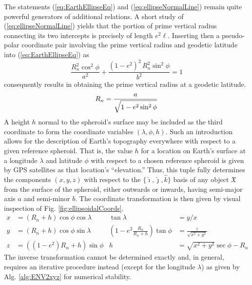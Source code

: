 \documentclass[11pt,dvipsnames]{thesis}
\begin{document}
The statements (\ref{eq:EarthEllipseEq}) and (\ref{eq:ellipseNormalLine}) remain quite powerful generators of additional relations. A short study of (\ref{eq:ellipseNormalLine}) yields that the portion of prime vertical radius connecting its two intercepts is precisely of length $e^2\ell$. Inserting then a pseudo-polar coordinate pair involving the prime vertical radius and geodetic latitude into (\ref{eq:EarthEllipseEq}) as
\begin{equation}
\frac{R_n^2 \cos^2\phi}{a^2} + \frac{(1 - e^2)^2\,R_n^2\sin^2\phi}{b^2} = 1
\end{equation}
consequently results in obtaining the prime vertical radius at a geodetic latitude.
\begin{equation}
R_n = \frac{a}{\sqrt{\vphantom{\cosphantom^2}1 - e^2 \,\smash{\sin}^2\,\phi}} \label{eq:primeVerticalRadius}
\end{equation}
A height $h$ normal to the spheroid's surface may be included as the third coordinate to form the coordinate variables $(\lambda, \phi, h)$. Such an introduction allows for the description of Earth's topography everywhere with respect to a given reference spheroid. That is, the value $h$ for a location on Earth's surface at a longitude $\lambda$ and latitude $\phi$ with respect to a chosen reference spheroid is given by GPS satellites as that location's ``elevation.'' Thus, this tuple fully determines the components $(x, y, z)$ with respect to the $\{\hat{\imath}, \hat{\jmath}, \hat{k}\}$ basis of any object $\mathfrak{X}$ from the surface of the spheroid, either outwards or inwards, having semi-major axis $a$ and semi-minor $b$. The coordinate transformation is then given by visual inspection of Fig. \ref{fig:ellipsoidalCoords}.
\begin{align}
x &= (R_n + h) \cos\phi \cos\lambda & \tan\lambda &= y/x \\
y &= (R_n + h) \cos\phi \sin\lambda & \left(1 - e^2\frac{R_n}{R_n + h}\right)\tan\phi &= \frac{z}{\sqrt{x^2 + y^2}} \\
z &= ((1-e^2)R_n +h) \sin\phi & h &= \sqrt{x^2 + y^2}\sec\phi - R_n
\end{align}
The inverse transformation cannot be determined exactly and, in general, requires an iterative procedure instead (except for the longitude $\lambda$) as given by Alg. \ref{alg:ENV2xyz} for numerical stability.
\end{document}
